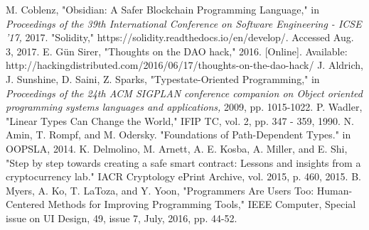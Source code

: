 \documentclass[sigplan,10pt,review]{acmart}\settopmatter{printfolios=true}
\begin{document}
\begin{thebibliography}{9}
	M. Coblenz, "Obsidian: A Safer Blockchain Programming Language," 
	in \emph{Proceedings of the 39th International Conference on Software Engineering -
	ICSE '17,} 2017.
	"Solidity," https://solidity.readthedocs.io/en/develop/. Accessed Aug. 3, 2017.
	E. G{\"u}n Sirer, "Thoughts on the DAO hack," 2016. [Online]. 
	Available: http://hackingdistributed.com/2016/06/17/thoughts-on-the-dao-hack/
	J. Aldrich, J. Sunshine, D. Saini, Z. Sparks,
	"Typestate-Oriented Programming,"
	in \emph{Proceedings of the 24th ACM SIGPLAN conference companion on Object oriented 
	programming systems languages and applications,} 2009, pp. 1015-1022.
	P. Wadler, "Linear Types Can Change the World,"
	IFIP TC, vol. 2, pp. 347 - 359, 1990.
	 N. Amin, T. Rompf, and M. Odersky. "Foundations of Path-Dependent Types." 
	 in OOPSLA, 2014.
	K. Delmolino, M. Arnett, A. E. Kosba, A. Miller, and E. Shi, 
	"Step by step towards creating a safe smart contract: Lessons and insights from a cryptocurrency lab."
	IACR Cryptology ePrint Archive, vol. 2015, p. 460, 2015.
	B. Myers, A. Ko, T. LaToza, and Y. Yoon, 
	"Programmers Are Users Too: Human-Centered Methods for Improving Programming Tools," 
	IEEE Computer, Special issue on UI Design, 49, issue 7, July, 2016, pp. 44-52.
\end{thebibliography}
	
\end{document}
